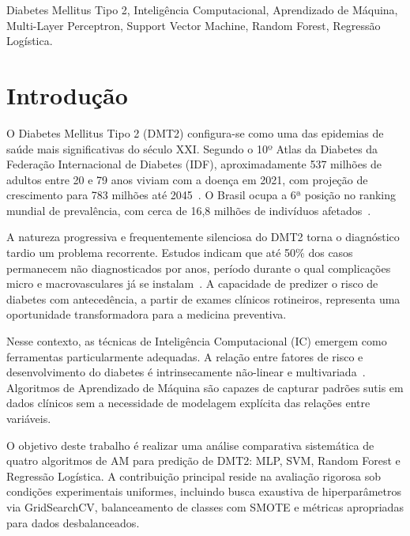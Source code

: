 \documentclass[conference]{IEEEtran}
\begin{document}
\begin{IEEEkeywords}
Diabetes Mellitus Tipo 2, Intelig\^{e}ncia Computacional, Aprendizado de M\'{a}quina, Multi-Layer Perceptron, Support Vector Machine, Random Forest, Regress\~ao Log\'{i}stica.
\end{IEEEkeywords}

\section{Introdu\c{c}\~ao}

O Diabetes Mellitus Tipo 2 (DMT2) configura-se como uma das epidemias de sa\'{u}de mais significativas do s\'{e}culo XXI. Segundo o 10º Atlas da Diabetes da Federa\c{c}\~ao Internacional de Diabetes (IDF), aproximadamente 537 milh\~oes de adultos entre 20 e 79 anos viviam com a doen\c{c}a em 2021, com proje\c{c}\~ao de crescimento para 783 milh\~oes at\'{e} 2045~\cite{idf2021}. O Brasil ocupa a 6ª posi\c{c}\~ao no ranking mundial de preval\^{e}ncia, com cerca de 16,8 milh\~oes de indiv\'{i}duos afetados~\cite{idf2021}.

A natureza progressiva e frequentemente silenciosa do DMT2 torna o diagn\'{o}stico tardio um problema recorrente. Estudos indicam que at\'{e} 50\% dos casos permanecem n\~ao diagnosticados por anos, per\'{i}odo durante o qual complica\c{c}\~oes micro e macrovasculares j\'{a} se instalam~\cite{kavakiotis2017}. A capacidade de predizer o risco de diabetes com anteced\^{e}ncia, a partir de exames cl\'{i}nicos rotineiros, representa uma oportunidade transformadora para a medicina preventiva.

Nesse contexto, as t\'{e}cnicas de Intelig\^{e}ncia Computacional (IC) emergem como ferramentas particularmente adequadas. A rela\c{c}\~ao entre fatores de risco e desenvolvimento do diabetes \'{e} intrinsecamente n\~ao-linear e multivariada~\cite{haykin2009}. Algoritmos de Aprendizado de M\'{a}quina s\~ao capazes de capturar padr\~oes sutis em dados cl\'{i}nicos sem a necessidade de modelagem expl\'{i}cita das rela\c{c}\~oes entre vari\'{a}veis.

O objetivo deste trabalho \'{e} realizar uma an\'{a}lise comparativa sistem\'{a}tica de quatro algoritmos de AM para predi\c{c}\~ao de DMT2: MLP, SVM, Random Forest e Regress\~ao Log\'{i}stica. A contribui\c{c}\~ao principal reside na avalia\c{c}\~ao rigorosa sob condi\c{c}\~oes experimentais uniformes, incluindo busca exaustiva de hiperpar\^{a}metros via GridSearchCV, balanceamento de classes com SMOTE e m\'{e}tricas apropriadas para dados desbalanceados.
\end{document}
